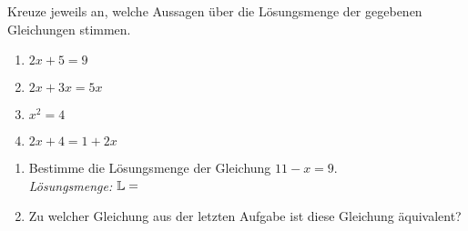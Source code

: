 \documentclass[]{uebungsblatt}
\begin{document}
\begin{exercise}
    Kreuze jeweils an, welche Aussagen über die Lösungsmenge der gegebenen Gleichungen stimmen.
    \begin{multicols}{4}
        \begin{enumerate}[label=\alph*)]
        \item $2x+5=9$
        \begin{multiplechoice}
            \citem $2\in\Solutions$
            \item $4\in\Solutions$
            \item $6\in\Solutions$
        \end{multiplechoice}

        \item $2x+3x=5x$

        \item $x^2=4$

        \item $2x+4=1+2x$
    \end{enumerate}
    \end{multicols}
\end{exercise}
\begin{exercise}
    \begin{enumerate}[label=\alph*)]
        \item Bestimme die Lösungsmenge der Gleichung $11-x=9$.\\
            \emph{Lösungsmenge:} $\mathbb{L}=$
        \item Zu welcher Gleichung aus der letzten Aufgabe ist diese Gleichung äquivalent?
        \begin{multicols}{4}
        \end{multicols}
    \end{enumerate}
\end{exercise}
\end{document}
